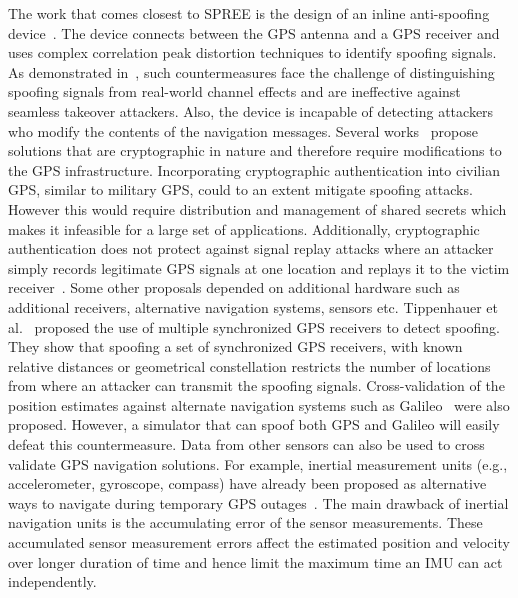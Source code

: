 \documentclass[letterpaper,twocolumn,10pt]{article}
\newcommand{\eg}{e.g.,\xspace}
\newcommand{\rxname}{SPREE\xspace}
\begin{document}
The work that comes closest to \rxname is the design of an inline anti-spoofing device~\cite{ledvina2001line}. The device connects between the GPS antenna and a GPS receiver and uses complex correlation peak distortion techniques to identify spoofing signals. As demonstrated in~\cite{Wesson2011}, such countermeasures face the challenge of distinguishing spoofing signals from real-world channel effects and are ineffective against seamless takeover attackers. Also, the device is incapable of detecting attackers who modify the contents of the navigation messages. Several works~\cite{kuhn2005asymmetric,lo2010authenticating,wesson2012practical} propose solutions that are cryptographic in nature and therefore require modifications to the GPS infrastructure. Incorporating cryptographic authentication into civilian GPS, similar to military GPS, could to an extent mitigate spoofing attacks. However this would require distribution and management of shared secrets which makes it infeasible for a large set of applications. Additionally, cryptographic authentication does not protect against signal replay attacks where an attacker simply records legitimate GPS signals at one location and replays it to the victim receiver~\cite{Papadimitratos2008}. Some other proposals depended on additional hardware such as additional receivers, alternative navigation systems, sensors etc. Tippenhauer et al.~\cite{Tippenhauer2011} proposed the use of multiple synchronized GPS receivers to detect spoofing. They show that spoofing a set of synchronized GPS receivers, with known relative distances or geometrical constellation restricts the number of locations from
where an attacker can transmit the spoofing signals. Cross-validation of the position estimates against alternate navigation systems such as Galileo~\cite{hofmann2007gnss} were also proposed. However, a simulator that can spoof both GPS and Galileo will easily defeat this countermeasure. Data from other sensors can also be used to cross validate GPS navigation solutions. For example, inertial measurement units (\eg accelerometer,
gyroscope, compass) have already been proposed as alternative ways to navigate
during temporary GPS outages~\cite{titterton2004strapdown,farrell1999global,wendel2006integrated}.
The main drawback of inertial navigation units is the accumulating error of the
sensor measurements. These accumulated sensor measurement errors affect the
estimated position and velocity over longer duration of time and hence limit
the maximum time an IMU can act independently.
\end{document}
